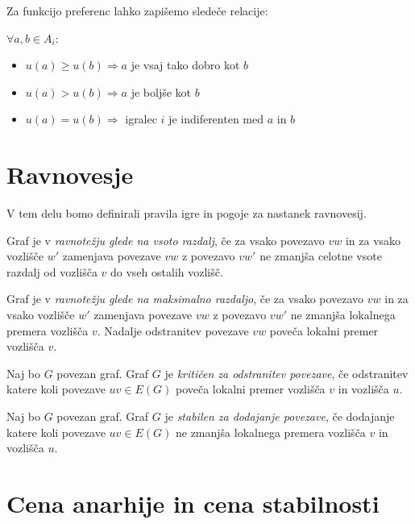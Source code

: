 \documentclass[fin1, tisk]{fmfdelo}
\begin{document}
Za funkcijo preferenc lahko zapišemo sledeče relacije:

\(\forall a,b \in A_i\):
\begin{itemize}
    \item \(u(a) \geq u(b) \Rightarrow a\) je vsaj tako dobro kot \(b\)
    \item \(u(a) > u(b) \Rightarrow a\) je boljše kot \(b\)
    \item \(u(a) = u(b) \Rightarrow\) igralec \(i\) je indiferenten med \(a\) in \(b\)
\end{itemize}

\section{Ravnovesje}

V tem delu bomo definirali pravila igre in pogoje za nastanek ravnovesij.

\begin{definicija}
Graf je v \textit{ravnotežju glede na vsoto razdalj}, če za vsako povezavo \(vw\) in za vsako vozlišče \(w'\) zamenjava povezave \(vw\) z povezavo \(vw'\) ne zmanjša celotne vsote razdalj od vozlišča \(v\) do vseh ostalih vozlišč.
\end{definicija}

\begin{definicija}
Graf je v \textit{ravnotežju glede na maksimalno razdaljo}, če za vsako povezavo \(vw\) in za vsako vozlišče \(w'\) zamenjava povezave \(vw\) z povezavo \(vw'\) ne zmanjša lokalnega premera vozlišča \(v\). Nadalje odstranitev povezave \(vw\) poveča lokalni premer vozlišča \(v\).
\end{definicija}

\begin{definicija}
Naj bo \(G\) povezan graf. Graf \(G\) je \textit{kritičen za odstranitev povezave}, če odstranitev katere koli povezave \(uv \in E(G)\) poveča lokalni premer vozlišča \(v\) in vozlišča \(u\).
\end{definicija}

\begin{definicija}
Naj bo \(G\) povezan graf. Graf \(G\) je \textit{stabilen za dodajanje povezave}, če dodajanje katere koli povezave \(uv \in E(G)\) ne zmanjša lokalnega premera vozlišča \(v\) in vozlišča \(u\).
\end{definicija}

\section{Cena anarhije in cena stabilnosti}
\end{document}
